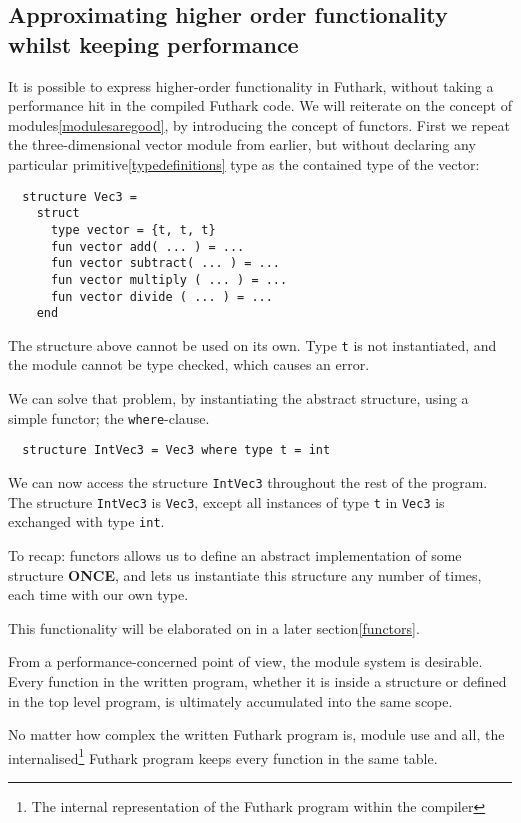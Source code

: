 \subsection{Approximating higher order functionality whilst keeping performance}
\label{subsec:higherorderfunctionality}
It is possible to express higher-order functionality in Futhark, without taking
a performance hit in the compiled Futhark code.
We will reiterate on the concept of modules\ref{modulesaregood}, by introducing
the concept of functors.
First we repeat the three-dimensional vector module
from earlier, but without declaring any particular
primitive\ref{typedefinitions} type as the contained type of the vector:
\begin{verbatim}
  structure Vec3 = 
    struct
      type vector = {t, t, t}
      fun vector add( ... ) = ...
      fun vector subtract( ... ) = ...
      fun vector multiply ( ... ) = ...
      fun vector divide ( ... ) = ...
    end
\end{verbatim}

The structure above cannot be used on its own. Type \texttt{t} is not
instantiated, and the module cannot be type checked, which causes an error.

We can solve that problem, by instantiating the abstract structure, using a
simple functor; the \texttt{where}-clause.
\begin{verbatim}
  structure IntVec3 = Vec3 where type t = int
\end{verbatim}
We can now access the structure \texttt{IntVec3} throughout the rest of the
program. The structure \texttt{IntVec3} is \texttt{Vec3}, except all instances
of type \texttt{t} in \texttt{Vec3} is exchanged with type \texttt{int}.

To recap: functors allows us to define an abstract implementation of some
structure \textbf{ONCE}, and lets us instantiate this structure any number of
times, each time with our own type.

This functionality will be elaborated on in a later section\ref{functors}. 

From a performance-concerned point of view, the module system is desirable.
Every function in the written program, whether it is inside a structure
or defined in the top level program, is ultimately accumulated into the same
scope.

No matter how complex the written Futhark program is, module use and all, the
internalised\footnote[]{The internal representation of the Futhark program
  within the compiler} Futhark program keeps every function in the same table.

